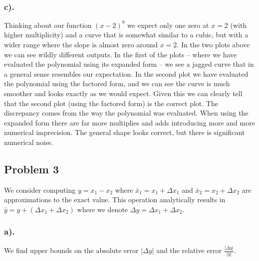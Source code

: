 \documentclass[11pt]{article}
\begin{document}
    \begin{center}
    \end{center}
    { \hspace*{\fill} \\}
    
    \hypertarget{c.}{%
\subsubsection*{c).}\label{c.}}

Thinking about our function \((x-2)^9\) we expect only one zero at
\(x=2\) (with higher multiplicity) and a curve that is somewhat similar
to a cubic, but with a wider range where the slope is almost zero around
\(x=2\). In the two plots above we can see wildly different outputs. In
the first of the plots -- where we have evaluated the polynomial using
its expanded form -- we see a jagged curve that in a general sense
resembles our expectation. In the second plot we have evaluated the
polynomial using the factored form, and we can see the curve is much
smoother and looks exactly as we would expect. Given this we can clearly
tell that the second plot (using the factored form) is the correct plot.
The discrepancy comes from the way the polynomial was evaluated. When
using the expanded form there are far more multiplies and adds
introducing more and more numerical imprecision. The general shape looks
correct, but there is significant numerical noise.

\newpage

    \hypertarget{problem-3}{%
\subsection*{Problem 3}\label{problem-3}}

We consider computing \(y=x_1-x_2\) where \(\bar{x}_1=x_1+\Delta x_1\)
and \(\bar{x}_2=x_2+\Delta x_2\) are approximations to the exact value.
This operation analytically results in
\(\bar{y}=y+(\Delta x_1 + \Delta x_2)\) where we denote
\(\Delta y=\Delta x_1 + \Delta x_2\).

    \hypertarget{a.}{%
\subsubsection*{a).}\label{a.}}

We find upper bounds on the absolute error \(|\Delta y|\) and the
relative error \(\frac{|\Delta y|}{|y|}\).
\end{document}
